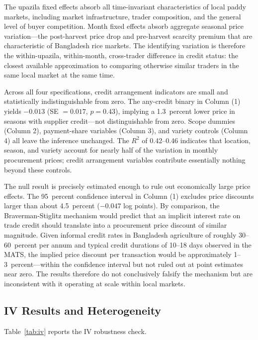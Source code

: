 \documentclass[authoryear,preprint,review,12pt]{elsarticle}
\begin{document}
The upazila fixed effects absorb all time-invariant characteristics of local
paddy markets, including market infrastructure, trader composition, and
the general level of buyer competition. Month fixed effects absorb
aggregate seasonal price variation---the post-harvest price drop and
pre-harvest scarcity premium that are characteristic of Bangladesh rice
markets. The identifying variation is therefore the within-upazila,
within-month, cross-trader difference in credit status: the closest
available approximation to comparing otherwise similar traders in the
same local market at the same time.

Across all four specifications, credit arrangement indicators are small and
statistically indistinguishable from zero. The any-credit binary in Column (1)
yields $-0.013$ (SE $= 0.017$, $p = 0.43$), implying a 1.3~percent lower
price in seasons with supplier credit---not distinguishable from zero.
Scope dummies (Column 2), payment-share variables (Column 3), and variety
controls (Column 4) all leave the inference unchanged. The $R^2$ of
0.42--0.46 indicates that location, season, and variety account for
nearly half of the variation in monthly procurement prices; credit
arrangement variables contribute essentially nothing beyond these controls.

The null result is precisely estimated enough to rule out economically
large price effects. The 95~percent confidence interval in Column (1)
excludes price discounts larger than about 4.5~percent ($-0.047$ log
points). By comparison, the Braverman-Stiglitz mechanism would predict
that an implicit interest rate on trade credit should translate into a
procurement price discount of similar magnitude. Given informal credit
rates in Bangladesh agriculture of roughly 30--60~percent per annum and
typical credit durations of 10--18 days observed in the MATS, the
implied price discount per transaction would be approximately
1--3~percent---within the confidence interval but not ruled out at point
estimates near zero. The results therefore do not conclusively falsify
the mechanism but are inconsistent with it operating at scale within
local markets.

\subsection{IV Results and Heterogeneity}

Table~\ref{tab:iv} reports the IV robustness check.
\end{document}
